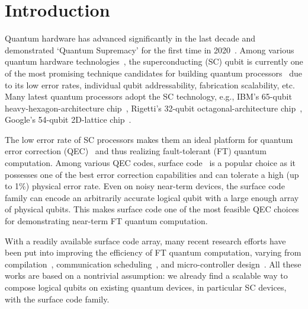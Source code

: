 \section{Introduction}

Quantum hardware has advanced significantly in the last decade and demonstrated `Quantum Supremacy' for the first time in 2020~\cite{Arute2019QuantumSU}. 
Among various quantum hardware technologies~\cite{Kok2007LinearOQ, DiVincenzo2000ThePI, AsselmeyerMaluga20213DTQ, Google72Q},
the superconducting (SC) qubit is currently one of the most promising technique candidates for building quantum processors~\cite{Paik2011ObservationOH, Chen2014QubitAW} due to its low error rates, individual qubit addressability, fabrication scalability, etc. Many latest quantum processors adopt the SC technology, e.g., IBM's 65-qubit heavy-hexagon-architecture  chip~\cite{zhang2020high}, Rigetti's 32-qubit octagonal-architecture chip~\cite{gold2021experimental}, Google's 54-qubit 2D-lattice chip~\cite{Arute2019QuantumSU}. %

The low error rate %
of SC processors makes them an ideal platform for %
quantum error correction (QEC)~\cite{shor1995scheme, steane1996error, calderbank1996good, steane1996multiple, bravyi1998quantum} and thus realizing fault-tolerant (FT) quantum computation. Among various QEC codes, surface code~\cite{fowler2012surface} is a popular choice as it possesses one of the best error correction capabilities and can tolerate a high (up to 1\%) physical error rate. Even on noisy near-term devices, the surface code family can encode an arbitrarily accurate logical qubit with a large enough array of physical qubits.
This makes  surface code one of the most feasible QEC choices for demonstrating near-term FT quantum computation.

With a readily available surface code array, many recent research efforts have been put into improving the efficiency of FT quantum computation, varying from compilation~\cite{Ding2018MagicStateFU, Paler2019SurfBraidAC}, communication scheduling~\cite{JavadiAbhari2017OptimizedSC, Hua2021AutoBraidAF}, and micro-controller design~\cite{Tannu2017TamingTI}. All these works are based on a nontrivial assumption: we already find a scalable way to compose logical qubits on existing quantum devices, in particular SC devices, with the surface code family.

